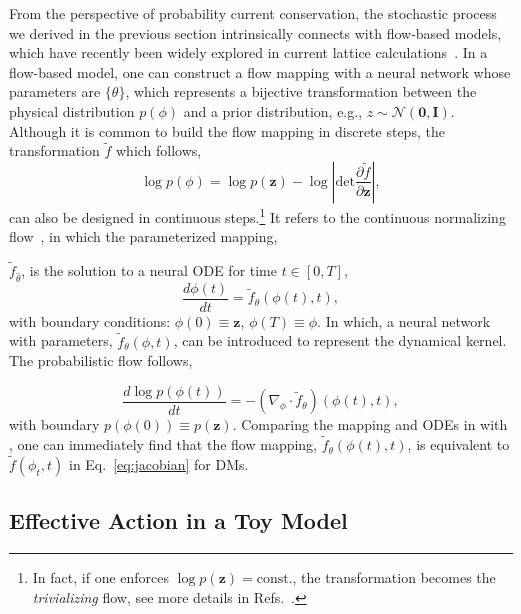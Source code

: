 From the perspective of probability current conservation, the stochastic process we derived in the previous section intrinsically connects with flow-based models, which have recently been widely explored in current lattice calculations~\cite{Albergo:2021vyo,Zhou:2023pti}. In a flow-based model, {one can construct a flow mapping with a neural network whose parameters are $\{\theta\}$, which represents a bijective transformation} between the physical distribution $p(\phi)$ and a prior distribution, e.g., 
$z\sim \mathcal{N}(\mathbf{0},\mathbf{I})$. Although it is common to build the flow mapping in discrete steps, {the transformation $\tilde{f}$ which follows,  
\begin{equation}
    \log p(\phi) = \log p(\mathbf{z}) - \log \left|\text{det}\frac{\partial \tilde{f}}{\partial \mathbf{z}}\right|, \label{eq:flow_mapping}
\end{equation}
}can also be designed in continuous steps.\footnote{In fact, if one enforces $\log p(\mathbf{z}) = \text{const.}$, the transformation becomes the \textit{trivializing} flow, see more details in Refs.~\cite{Luscher:2009eq,DelDebbio:2021qwf,Bacchio:2022vje,Albandea:2023wgd}.} It refers to the continuous normalizing flow~\cite{Gerdes:2022eve}, in which the parameterized mapping, {$\tilde{f}_{\hat{\theta}}$, is the solution to a neural ODE for time $t\in [0,T]$,
\begin{equation}
    \frac{d \phi(t)}{ dt} = \tilde{f}_\theta(\phi(t),t),\label{eq:flow_ode}
\end{equation}
with boundary conditions: $\phi(0) \equiv \mathbf{z}$, $\phi(T)\equiv \phi$. In which, a neural network with parameters, $\tilde{f}_\theta(\phi,t)$, can be introduced to represent the dynamical kernel. The probabilistic flow follows,

\begin{equation}
    \frac{d \log p(\phi(t))}{ dt} = - \left(\nabla_\phi\cdot \tilde{f}_\theta\right)(\phi(t),t)\label{eq:flow_action},
\end{equation}
with boundary $p(\phi(0)) \equiv p(\mathbf{z})$. Comparing the mapping and ODEs in  with , one can immediately find that the flow mapping, $\tilde{f}_\theta(\phi(t),t)$, is equivalent to $\tilde{f}(\phi_t,t)$ in Eq.~\eqref{eq:jacobian} for DMs.}


\subsection{Effective Action in a Toy Model}

